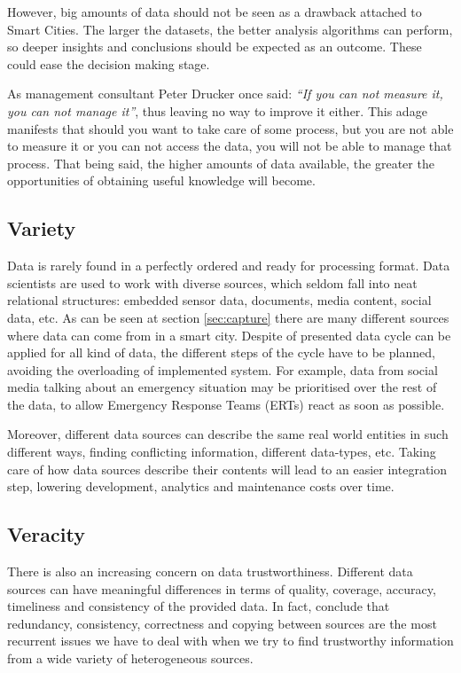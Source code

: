 
However, big amounts of data should not be seen as a drawback attached to Smart Cities. The larger the datasets, the better analysis algorithms can perform, so deeper insights and conclusions should be expected as an outcome. These could ease the decision making stage.

As management consultant Peter Drucker once said: \textit{``If you can not measure it, you can not manage it''}, thus leaving no way to improve it either. This adage manifests that should you want to take care of some process, but you are not able to measure it or you can not access the data, you will not be able to manage that process. That being said, the higher amounts of data available, the greater the opportunities of obtaining useful knowledge will become.

\subsection{Variety}

Data is rarely found in a perfectly ordered and ready for processing format. Data scientists are used to work with diverse sources, which seldom fall into neat relational structures: embedded sensor data, documents, media content, social data, etc. As can be seen at section \ref{sec:capture} there are many different sources where data can come from in a smart city. Despite of presented data cycle can be applied for all kind of data, the different steps of the cycle have to be planned, avoiding the overloading of implemented system. For example, data from social media talking about an emergency situation may be prioritised over the rest of the data, to allow Emergency Response Teams (ERTs) react as soon as possible.

Moreover, different data sources can describe the same real world entities in such different ways, finding conflicting information, different data-types, etc. Taking care of how data sources describe their contents will lead to an easier integration step, lowering development, analytics and maintenance costs over time.

\subsection{Veracity}

There is also an increasing concern on data trustworthiness. Different data sources can have meaningful differences in terms of quality, coverage, accuracy, timeliness and consistency of the provided data. In fact, \cite{xian_truth_2013} conclude that redundancy, consistency, correctness and copying between sources are the most recurrent issues we have to deal with when we try to find trustworthy information from a wide variety of heterogeneous sources.

